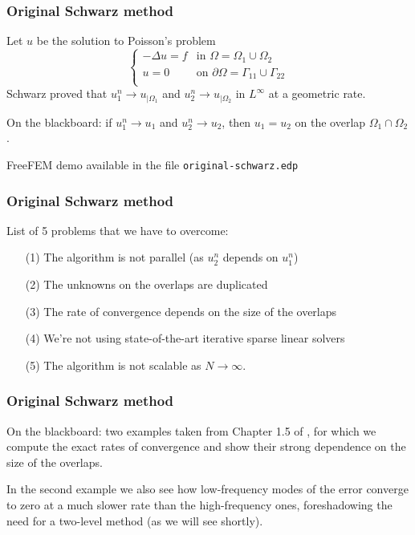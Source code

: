 \documentclass{beamer}
\begin{document}
\begin{frame}
\frametitle{Original Schwarz method}
Let $u$ be the solution to Poisson's problem
\[
\begin{cases}
	-\Delta u = f & \text{in $\Omega = \Omega_1 \cup \Omega_2$} \\
	u = 0 & \text{on $\partial \Omega = \Gamma_{11} \cup \Gamma_{22}$} \\
\end{cases}
\]
Schwarz proved that $u_1^n \to u_{|\Omega_1}$ and $u_2^n \to u_{|\Omega_2}$
in $L^\infty$ at a geometric rate.
\pause

On the blackboard: if $u_1^n \to u_1$ and $u_2^n \to u_2$, then $u_1 = u_2$
on the overlap $\Omega_1 \cap \Omega_2$.
\pause

FreeFEM demo available in the file \texttt{original-schwarz.edp}
\end{frame}

\begin{frame}
\frametitle{Original Schwarz method}
List of 5 problems that we have to overcome:
\begin{enumerate}%
\item[(1)] The algorithm is not parallel (as $u_2^n$ depends on $u_1^n$)
\item[(2)] The unknowns on the overlaps are duplicated
\item[(3)] The rate of convergence depends on the size of the overlaps
\item[(4)] We're not using state-of-the-art iterative sparse linear solvers
\item[(5)] The algorithm is not scalable as $N \to \infty$.
\end{enumerate}
\end{frame}

\begin{frame}
\frametitle{Original Schwarz method}
On the blackboard: two examples taken from Chapter 1.5 of \cite{nataf},
for which we compute the exact rates of convergence and show their
strong dependence on the size of the overlaps.

In the second example we also see how low-frequency modes of the error
converge to zero at a much slower rate than the high-frequency ones,
foreshadowing the need for a two-level method (as we will see shortly).
\end{frame}
\end{document}
